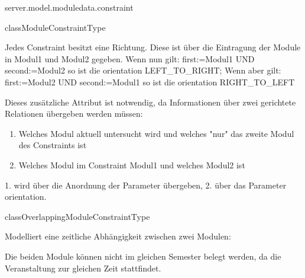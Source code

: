 \begin{texdocpackage}{server.model.moduledata.constraint}
\begin{texdocclass}{class}{ModuleConstraintType}
\begin{texdocclassmethods}
{\begin{texdocparameters}
{            Jedes Constraint besitzt eine Richtung. Diese ist über die
            Eintragung der Module in Modul1 und Modul2 gegeben. Wenn nun
            gilt: first:=Modul1 UND second:=Modul2 so ist die orientation
            LEFT\_TO\_RIGHT; Wenn aber gilt: first:=Modul2 UND
            second:=Modul1 so ist die orientation RIGHT\_TO\_LEFT\texdocbr{}

            Dieses zusätzliche Attribut ist notwendig, da Informationen
            über zwei gerichtete Relationen übergeben werden müssen:
            \begin{enumerate}

            \item Welches Modul aktuell untersucht wird und welches "nur"
            das zweite Modul des Constraints ist
            \item Welches Modul im Constraint Modul1 und welches Modul2 ist
            
            
\end{enumerate}
            1. wird über die Anordnung der Parameter übergeben, 2. über
            das Parameter orientation.}
\end{texdocparameters}
}
\end{texdocclassmethods}
\end{texdocclass}


\begin{texdocclass}{class}{OverlappingModuleConstraintType}
\label{texdoclet:edu.kit.informatik.studyplan.server.model.moduledata.constraint.OverlappingModuleConstraintType}
\begin{texdocclassintro}
Modelliert eine zeitliche Abhängigkeit zwischen zwei Modulen:\texdocbr{}

 Die beiden Module können nicht im gleichen Semester belegt werden, da die Veranstaltung zur gleichen Zeit stattfindet.\end{texdocclassintro}
\begin{texdocclassconstructors}
\end{texdocclassconstructors}
\begin{texdocclassmethods}
\end{texdocclassmethods}
\end{texdocclass}



\end{texdocpackage}
